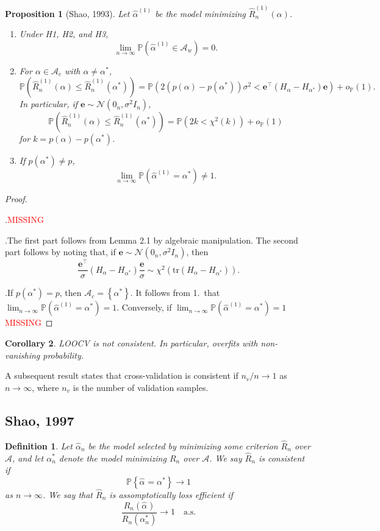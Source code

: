 \documentclass[12pt, letter paper]{article}
\newcommand{\1}{\mathmybb{1}}
\newtheorem{definition}{Definition}[section]
\newtheorem{proposition}{Proposition}[section]
\newtheorem{corollary}[proposition]{Corollary}
\newcommand{\0}{\emptyset}
\newcommand{\prob}{\mathbb{P}}
\newcommand{\paren}[1]{\left(#1 \right)}
\newcommand{\set}[1]{\left\{ #1 \right\}}
\newcommand{\Acal}{\mathcal{A}}
\newcommand{\Ncal}{\mathcal{N}}
\newcommand{\e}{\boldsymbol{e}}
\newcommand{\alphahat}[1]{\hat{\alpha}^{#1}}
\newcommand{\loocv}[1]{\hat{R}^{(1)}_{n}\paren{#1}}
\newcommand{\op}[1]{o_{\prob}\paren{#1}}
\begin{document}
\begin{proposition}[Shao, 1993]
    Let \(\alphahat{(1)}\) be the model minimizing \(\loocv{\alpha}\).
    \begin{enumerate}
        \item Under H1, H2, and H3, \[\lim_{n\to\infty}\prob\paren{\alphahat{(1)}\in\Acal_{w}}=0.\]
        \item For \(\alpha\in\Acal_{c}\) with \(\alpha\neq\alpha^{*}\),\[\prob\paren{\loocv{\alpha}\leq \loocv{\alpha^{*}}} = \prob\paren{2\paren{p(\alpha) - p(\alpha^{*})}\sigma^{2} < \e^{\top}(H_{\alpha} - H_{\alpha^{*}})\e} + \op{1}.\] In particular, if \(\e\sim\Ncal(0_{n}, \sigma^{2}I_n)\), \[\prob\paren{\loocv{\alpha}\leq \loocv{\alpha^{*}}} = \prob\paren{2k < \chi^{2}(k)} + \op{1} \] for \(k=p(\alpha) - p(\alpha^{*})\).
        \item If \(p(\alpha^*) \neq p\), \[\lim_{n\to\infty}\prob\paren{\alphahat{(1)}=\alpha^{*}}\neq 1.\]
    \end{enumerate}
\end{proposition}

\begin{proof}
    \(\)

    .\quad \textcolor{red}{MISSING}

    .\quad The first part follows from Lemma 2.1 by algebraic manipulation. The second part follows by noting that, if \(\e\sim\Ncal(0_{n}, \sigma^{2}I_{n})\), then \[\frac{\e^{\top}}{\sigma}\paren{H_{\alpha} - H_{\alpha^{*}}}\frac{\e}{\sigma}\sim\chi^{2}\paren{\mathrm{tr}\paren{H_{\alpha}-H_{\alpha^{*}}}}.\]

    .\quad If \(p(\alpha^{*}) = p\), then \(\Acal_{c} = \set{\alpha^{*}}\). It follows from 1.\ that \(\lim_{n\to\infty}\prob\paren{\alphahat{(1)}=\alpha^{*} }= 1\).
    Conversely, if \(\lim_{n\to\infty}\prob\paren{\alphahat{(1)}=\alpha^{*}} = 1\) \textcolor{red}{MISSING}
\end{proof}

\begin{corollary}
    LOOCV is not consistent. In particular, overfits with non-vanishing probability.
\end{corollary}

A subsequent result states that cross-validation is consistent if \(n_{v}/n\to 1\) as \(n\to\infty\), where \(n_{v}\) is the number of validation samples.

\subsection{Shao, 1997}
\begin{definition}
    Let \(\alphahat{}_{n}\) be the model selected by minimizing some criterion \(\hat{R}_{n}\) over \(\Acal\), and let \(\alpha^{*}_{n}\) denote the model minimizing \(R_{n}\) over \(\Acal\). We say \(\hat{R}_{n}\) is \emph{consistent} if 
    \[\prob\set{\alphahat{} = \alpha^{*}}\to 1\]
    as \(n\to\infty\). We say that \(\hat{R}_{n}\) is \emph{assomptotically loss efficient} if 
    \[\frac{R_{n}(\alphahat{})}{R_{n}(\alpha^{*}_{n})}\to 1\quad\text{a.s.}\]
\end{definition}
\end{document}
